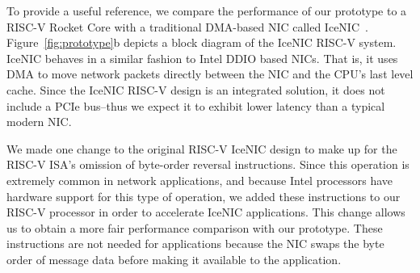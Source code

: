 To provide a useful reference, we compare the performance of our \name{} prototype to a RISC-V Rocket Core with a traditional DMA-based NIC called IceNIC~\cite{firesim}.
Figure~\ref{fig:prototype}b depicts a block diagram of the IceNIC RISC-V system.
IceNIC behaves in a similar fashion to Intel DDIO based NICs.
That is, it uses DMA to move network packets directly between the NIC and the CPU's last level cache.
Since the IceNIC RISC-V design is an integrated solution, it does not include a PCIe bus--thus we expect it to exhibit lower latency than a typical modern NIC.

We made one change to the original RISC-V IceNIC design to make up for the RISC-V ISA's omission of byte-order reversal instructions. Since this operation is extremely common in network applications, and because Intel processors have hardware support for this type of operation, we added these instructions to our RISC-V processor in order to accelerate IceNIC applications. This change allows us to obtain a more fair performance comparison with our \name{} prototype. These instructions are not needed for \name{} applications because the NIC swaps the byte order of message data before making it available to the application.

